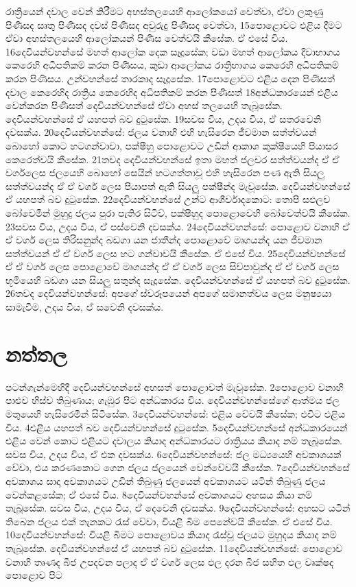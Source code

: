 \documentclass[10pt]{book}
\begin{document}
රාත්‍රියෙන් දවාල වෙන් කිරීමට අහස්තලයෙහි ආලෝකයෝ වෙත්වා, ඒවා ලකුණු පිණිසද සෘතු පිණිසද දවස් පිණිසද අවුරුදු පිණිසද වෙත්වා, 15පොළොවට එළිය දීමට ඒවා අහස්තලයෙහි ආලෝකයන් පිණිස වෙත්වයි කීසේක. ඒ එසේ විය. 16දෙවියන්වහන්සේ මහත් ආලෝක දෙක සෑදූසේක; වඩා මහත් ආලෝකය දිවාභාගය කෙරෙහි අධිපතිකම් කරන පිණිසය, කුඩා ආලෝකය රාත්‍රිභාගය කෙරෙහි අධිපතිකම් කරන පිණිසය. උන්වහන්සේ තාරකාද සෑදූසේක. 17පොළොවට එළිය දෙන පිණිසත් දවාල කෙරෙහිද රාත්‍රිය කෙරෙහිද අධිපතිකම් කරන පිණිසත් 18අන්ධකාරයෙන් එළිය වෙන්කරන පිණිසත් දෙවියන්වහන්සේ ඒවා අහස් තලයෙහි තැබූසේක. දෙවියන්වහන්සේ ඒ යහපත් බව දුටුසේක. 19සවස විය, උදය විය, ඒ සතරවෙනි දවසක්ය. 20දෙවියන්වහන්සේ: ජලය වනාහි එහි හැසිරෙන ජීවමාන සත්ත්වයන් බොහෝ කොට හටගන්වාවා, පක්ෂීහු පොළොවට උඩින් ආකාශ කුක්ෂීයෙහි පියාසර කෙරෙත්වයි කීසේක. 21තවද දෙවියන්වහන්සේ ඉතා මහත් ජලචර සත්ත්වයන්ද ඒ ඒ වර්ගලෙස ජලයෙහි බොහෝ සෙයින් හටගත්තාවූ එහි හැසිරෙන පණ ඇති සියලු සත්ත්වයන්ද ඒ ඒ වර්ග ලෙස පියාපත් ඇති සියලු පක්ෂීන්ද මැවූසේක. දෙවියන්වහන්සේ ඒ යහපත් බව දුටුසේක. 22දෙවියන්වහන්සේ උන්ට ආශීර්වාදකොට: තොපි සඵලව බෝවෙමින් මුහුදු ජලය පුරා පැතිර සිටිව්, පක්ෂීහුද පොළොවෙහි බෝවෙත්වයි කීසේක. 23සවස විය, උදය විය, ඒ පස්වෙනි දවසක්ය. 24දෙවියන්වහන්සේ: පොළොව වනාහි ඒ ඒ වර්ග ලෙස තිරිසනුන්ද බඩගා යන ජාතීන්ද පොළොවේ මෘගයන්ද යන ජීවමාන සත්ත්වයන් ඒ ඒ වර්ග ලෙස හට ගන්වාවයි කීසේක. ඒ එසේ විය. 25දෙවියන්වහන්සේ ඒ ඒ වර්ග ලෙස පොළොවේ මෘගයන්ද ඒ ඒ වර්ග ලෙස සිව්පාවුන්ද ඒ ඒ වර්ග ලෙස භූමියෙහි බඩගා යන සියලු සතුන්ද සෑදූසේක. දෙවියන්වහන්සේ ඒ යහපත් බව දුටුසේක. 26තවද දෙවියන්වහන්සේ: අපගේ ස්වරූපයෙන් අපගේ සමානත්වය ලෙස මනුෂ්‍යයා සාමැවීම, උදය විය, ඒ සවෙනි දවසක්ය. 
 
\section{නත්තල}                
පටන්ගැන්මෙහිදී දෙවියන්වහන්සේ අහසත් පොළොවත් මැවූසේක. 2පොළොව වනාහි පාළුව හිස්ව තිබුණාය; ගැඹුර පිට අන්ධකාරය විය. දෙවියන්වහන්සේගේ ආත්මය ජල මතුයෙහි හැසිරෙමින් සිටිසේක. 3දෙවියන්වහන්සේ: එළිය වේවයි කීසේක; එවිට එළිය විය. 4එළිය යහපත් බව දෙවියන්වහන්සේ දුටුසේක. 5දෙවියන්වහන්සේ අන්ධකාරයෙන් එළිය වෙන් කොට එළියට දවාලය කියාද අන්ධකාරයට රාත්‍රියය කියාද නම් තැබූසේක. සවස විය, උදය විය, ඒ එක දවසක්ය. 6දෙවියන්වහන්සේ: ජල මධ්‍යයෙහි අවකාශයක් වේවා, එය කරණකොට ගෙන ජලය ජලයෙන් වෙන්වේවයි කීසේක. 7දෙවියන්වහන්සේ අවකාශය සාදා අවකාශයට උඩින් තිබුණු ජලයෙන් අවකාශයට යටින් තිබුණු ජලය වෙන්කළසේක; ඒ එසේ විය. 8දෙවියන්වහන්සේ අවකාශයට අහසය කියා නම් තැබූසේක. සවස විය, උදය විය, ඒ දෙවෙනි දවසක්ය. 9දෙවියන්වහන්සේ: අහසට යටින් තිබෙන ජලය එක් තැනකට රැස් වේවා, වියළි බිම පෙනේවයි කීසේක. ඒ එසේ විය. 10දෙවියන්වහන්සේ: වියළි බිමට පොළොවය කියාද රැස්වූ ජලයට මුහුදය කියාද නම් තැබූසේක. දෙවියන්වහන්සේ ඒ යහපත් බව දුටුසේක. 11දෙවියන්වහන්සේ: පොළොව වනාහි තෘණද බීජ උපදවන පලාද ඒ ඒ වර්ග ලෙස ඵල දරන බීජ සහිත ඵල වෘක්ෂද පොළොව පිට 
\end{document}
